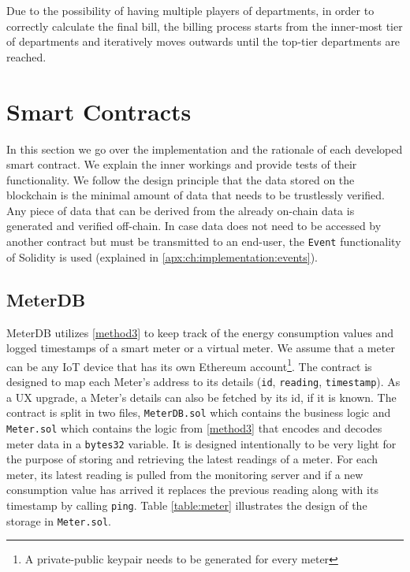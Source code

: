 

Due to the possibility of having multiple players of departments, in order to correctly calculate the final bill, the billing process starts from the inner-most tier of departments and iteratively moves outwards until the top-tier departments are reached.

\section{Smart Contracts} \label{ch:implementation:sc}
In this section we go over the implementation and the rationale of each developed smart contract. We explain the inner workings and provide tests of their functionality. We follow the design principle that the data stored on the blockchain is the minimal amount of data that needs to be trustlessly verified. Any piece of data that can be derived from the already on-chain data is generated and verified off-chain. In case data does not need to be accessed by another contract but must be transmitted to an end-user, the \texttt{Event} functionality of Solidity is used (explained in \ref{apx:ch:implementation:events}). 

\subsection{MeterDB}
MeterDB utilizes \ref{method3} to keep track of the energy consumption values and logged timestamps of a smart meter or a virtual meter. We assume that a meter can be any IoT device that has its own Ethereum account\footnote{A private-public keypair needs to be generated for every meter}. The contract is designed to map each Meter's address to its details (\texttt{id}, \texttt{reading}, \texttt{timestamp}). As a UX upgrade, a Meter's details can also be fetched by its id, if it is known. The contract is split in two files, \texttt{MeterDB.sol} which contains the business logic and \texttt{Meter.sol} which contains the logic from \ref{method3} that encodes and decodes meter data in a \texttt{bytes32} variable. It is designed intentionally to be very light for the purpose of storing and retrieving the latest readings of a meter. For each meter, its latest reading is pulled from the monitoring server and if a new consumption value has arrived it replaces the previous reading along with its timestamp by calling \texttt{ping}. Table \ref{table:meter} illustrates the design of the storage in \texttt{Meter.sol}.



